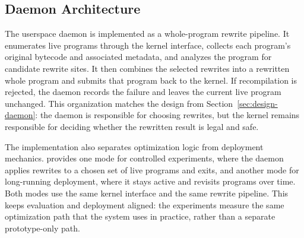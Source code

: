 \subsection{Daemon Architecture}
\label{sec:impl-daemon}

The userspace daemon is implemented as a whole-program rewrite pipeline. It enumerates live programs through the kernel interface, collects each program's original bytecode and associated metadata, and analyzes the program for candidate rewrite sites. It then combines the selected rewrites into a rewritten whole program and submits that program back to the kernel. If recompilation is rejected, the daemon records the failure and leaves the current live program unchanged. This organization matches the design from Section~\ref{sec:design-daemon}: the daemon is responsible for choosing rewrites, but the kernel remains responsible for deciding whether the rewritten result is legal and safe.

The implementation also separates optimization logic from deployment mechanics. \tool provides one mode for controlled experiments, where the daemon applies rewrites to a chosen set of live programs and exits, and another mode for long-running deployment, where it stays active and revisits programs over time. Both modes use the same kernel interface and the same rewrite pipeline. This keeps evaluation and deployment aligned: the experiments measure the same optimization path that the system uses in practice, rather than a separate prototype-only path.